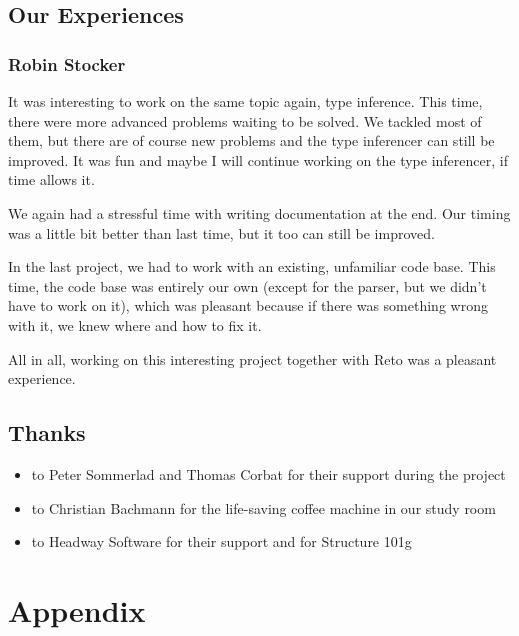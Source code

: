 \documentclass[12pt,halfparskip,DIV11,BCOR10mm]{scrreprt}
\begin{document}
\section{Our Experiences}

\subsection{Robin Stocker}

It was interesting to work on the same topic again, type inference. This time, there were more advanced problems waiting to be solved. We tackled most of them, but there are of course new problems and the type inferencer can still be improved. It was fun and maybe I will continue working on the type inferencer, if time allows it.

We again had a stressful time with writing documentation at the end. Our timing was a little bit better than last time, but it too can still be improved.

In the last project, we had to work with an existing, unfamiliar code base. This time, the code base was entirely our own (except for the parser, but we didn't have to work on it), which was pleasant because if there was something wrong with it, we knew where and how to fix it.

All in all, working on this interesting project together with Reto was a pleasant experience.

\section{Thanks}

\begin{itemize}
    \item to Peter Sommerlad and Thomas Corbat for their support during the project
    \item to Christian Bachmann for the life-saving coffee machine in our study room
    \item to Headway Software for their support and for Structure 101g
\end{itemize}



\setcounter{secnumdepth}{-1}
\chapter{Appendix}
\end{document}
